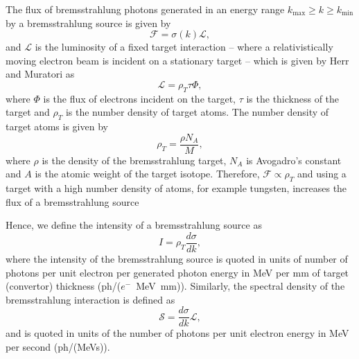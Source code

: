 \documentclass[../main.tex]{subfiles}
\begin{document}
The flux of bremsstrahlung photons generated in an energy range $k_{\mathrm{max}} \geq k \geq k_{\mathrm{min}}$ by a bremsstrahlung source is given by
\begin{equation}
\mathcal{F} = \sigma\left(k\right)\mathcal{L},    
\end{equation}
and $\mathcal{L}$ is the luminosity of a fixed target interaction -- where a relativistically moving electron beam is incident on a stationary target -- which is given by Herr and Muratori \cite{herr2006concept} as
\begin{equation}
\mathcal{L} = \rho_{T}\tau\Phi,
\label{eq:bremsstrahlung_luminosity}
\end{equation}
where $\Phi$ is the flux of electrons incident on the target, $\tau$ is the thickness of the target and $\rho_{T}$ is the number density of target atoms. The number density of target atoms is given by
\begin{equation}
\rho_{T} = \frac{\rho N_{A}}{M},
\label{eq:target_number_density}    
\end{equation}
where $\rho$ is the density of the bremsstrahlung target, $N_{A}$ is Avogadro's constant and $A$ is the atomic weight of the target isotope. Therefore, $\mathcal{F} \propto \rho_{T}$ and using a target with a high number density of atoms, for example tungsten, increases the flux of a bremsstrahlung source

Hence, we define the intensity of a bremsstrahlung source as
\begin{equation}
I = \rho_{T}\frac{d\sigma}{dk},
\label{eq:bremsstrahlung_intensity}    
\end{equation}
where the intensity of the bremsstrahlung source is quoted in units of number of photons per unit electron per generated photon energy in \si{\mega\electronvolt} per \si{\milli\meter} of target (convertor) thickness (ph/($e^{-}$~\si{\mega\electronvolt}~\si{\milli\meter})). Similarly, the spectral density of the bremsstrahlung interaction is defined as
\begin{equation}
\mathcal{S} = \frac{d\sigma}{dk}\mathcal{L},
\label{eq:bremsstrahlung_spectral_density}    
\end{equation}
and is quoted in units of the number of photons per unit electron energy in \si{\mega\electronvolt} per second (ph/(\si{\mega\electronvolt}\si{\second})).
\end{document}
